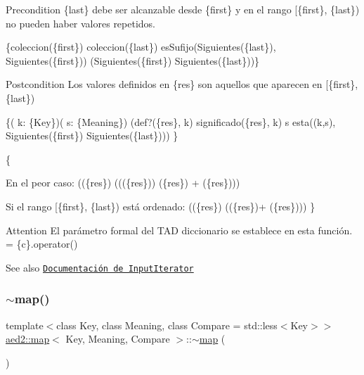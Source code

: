 \begin{DoxyPrecond}{Precondition}
\{last\} debe ser alcanzable desde \{first\} y en el rango \mbox{[}\{first\}, \{last\}) no pueden haber valores repetidos.

\{coleccion(\{first\})  coleccion(\{last\})  es\+Sufijo(Siguientes(\{last\}), Siguientes(\{first\}))  (Siguientes(\{first\})  Siguientes(\{last\}))\} 
\end{DoxyPrecond}


\begin{DoxyPostcond}{Postcondition}
Los valores definidos en \{res\} son aquellos que aparecen en \mbox{[}\{first\}, \{last\})

\{( k\+: \{Key\})( s\+: \{Meaning\}) (def?(\{res\}, k)  significado(\{res\}, k)  s  esta((k,s), Siguientes(\{first\})  Siguientes(\{last\}))) \} 
\end{DoxyPostcond}


\{
\begin{DoxyItemize}
\item En el peor caso\+: ((\{res\})  (((\{res\}))  (\{res\}) + (\{res\})))
\item Si el rango \mbox{[}\{first\}, \{last\}) está ordenado\+: ((\{res\})  ((\{res\})+ (\{res\}))) \}
\end{DoxyItemize}

\begin{DoxyAttention}{Attention}
El parámetro formal  del T\+AD diccionario se establece en esta función.  = \{c\}.operator()
\end{DoxyAttention}
\begin{DoxySeeAlso}{See also}
\href{http://en.cppreference.com/w/cpp/concept/InputIterator}{\tt Documentación de Input\+Iterator} 
\end{DoxySeeAlso}
\mbox{\label{classaed2_1_1map_ab22c9a85c2dadbc286cd30e97069a8e6}} 
\subsubsection{\texorpdfstring{$\sim$map()}{~map()}\hspace{0.1cm}{\footnotesize\ttfamily [1/2]}}
{\footnotesize\ttfamily template$<$class Key, class Meaning, class Compare = std\+::less$<$\+Key$>$$>$ \\
\hyperlink{classaed2_1_1map}{aed2\+::map}$<$ Key, Meaning, Compare $>$\+::$\sim$\hyperlink{classaed2_1_1map}{map} (\begin{DoxyParamCaption}{ }\end{DoxyParamCaption})\hspace{0.3cm}{\ttfamily [inline]}}



